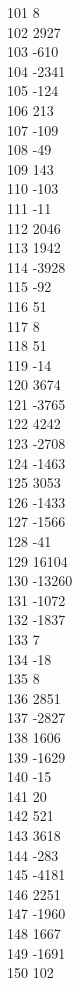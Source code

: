 { 101	8 \\
 102	2927 \\
 103	-610 \\
 104	-2341 \\
 105	-124 \\
 106	213 \\
 107	-109 \\
 108	-49 \\
 109	143 \\
 110	-103 \\
 111	-11 \\
 112	2046 \\
 113	1942 \\
 114	-3928 \\
 115	-92 \\
 116	51 \\
 117	8 \\
 118	51 \\
 119	-14 \\
 120	3674 \\
 121	-3765 \\
 122	4242 \\
 123	-2708 \\
 124	-1463 \\
 125	3053 \\
 126	-1433 \\
 127	-1566 \\
 128	-41 \\
 129	16104 \\
 130	-13260 \\
 131	-1072 \\
 132	-1837 \\
 133	7 \\
 134	-18 \\
 135	8 \\
 136	2851 \\
 137	-2827 \\
 138	1606 \\
 139	-1629 \\
 140	-15 \\
 141	20 \\
 142	521 \\
 143	3618 \\
 144	-283 \\
 145	-4181 \\
 146	2251 \\
 147	-1960 \\
 148	1667 \\
 149	-1691 \\
 150	102 \\
}
